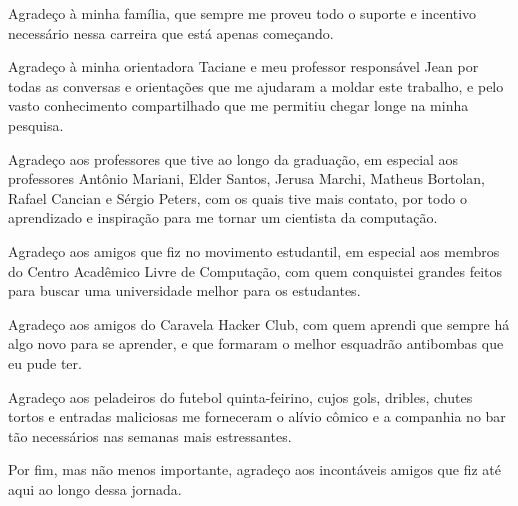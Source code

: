 \begin{agradecimentos}
    Agradeço à minha família, que sempre me proveu todo o suporte e incentivo
    necessário nessa carreira que está apenas começando.

    Agradeço à minha orientadora Taciane e meu professor responsável Jean por
    todas as conversas e orientações que me ajudaram a moldar este trabalho, e
    pelo vasto conhecimento compartilhado que me permitiu chegar longe na minha
    pesquisa.

    Agradeço aos professores que tive ao longo da graduação, em especial aos
    professores Antônio Mariani, Elder Santos, Jerusa Marchi, Matheus Bortolan,
    Rafael Cancian e Sérgio Peters, com os quais tive mais contato, por todo o
    aprendizado e inspiração para me tornar um cientista da computação.

    Agradeço aos amigos que fiz no movimento estudantil, em especial aos
    membros do Centro Acadêmico Livre de Computação, com quem conquistei
    grandes feitos para buscar uma universidade melhor para os estudantes.

    Agradeço aos amigos do Caravela Hacker Club, com quem aprendi que sempre há
    algo novo para se aprender, e que formaram o melhor esquadrão antibombas
    que eu pude ter.

    Agradeço aos peladeiros do futebol quinta-feirino, cujos gols, dribles,
    chutes tortos e entradas maliciosas me forneceram o alívio cômico e a
    companhia no bar tão necessários nas semanas mais estressantes.

    Por fim, mas não menos importante, agradeço aos incontáveis amigos que fiz
    até aqui ao longo dessa jornada.
\end{agradecimentos}
